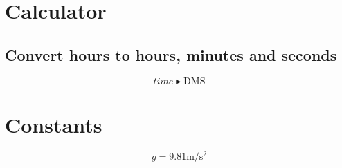 \documentclass[a4paper]{article}
\begin{document}
  \section{Calculator}
  \subsection{Convert hours to hours, minutes and seconds}
  \begin{equation}
    time \blacktriangleright \mbox{DMS}
  \end{equation}

  \section{Constants}
  \begin{equation}
    g = 9.81 \si{\metre\per\square\second}
  \end{equation}
\end{document}
